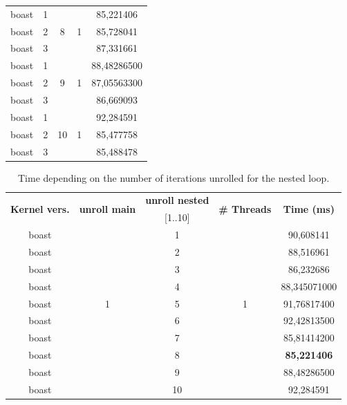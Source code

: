 \documentclass[10pt,twoside]{article}   	%
\begin{document}
\begin{table}[ht!]
{\begin{tabular}{|c|c|c|c|c|}
boast &    1 &  &  & 85,221406 \\ \cline{1-2}  \cline{5-5}
boast &    2 & 8 & 1 & 85,728041 \\ \cline{1-2}  \cline{5-5}
boast &   3 &  &  & 87,331661 \\ \hline \hline

boast &   1 &  &  & 88,48286500 \\ \cline{1-2}  \cline{5-5}
boast &    2 & 9 & 1 & 87,05563300 \\ \cline{1-2}  \cline{5-5}
boast &    3 &  &  & 86,669093 \\ \hline \hline

boast &    1 &  &  & 92,284591 \\ \cline{1-2}  \cline{5-5}
boast &    2 & 10 & 1 & 85,477758 \\ \cline{1-2}  \cline{5-5}
boast &   3 & &  & 85,488478 \\ \hline
\end{tabular}
}
\label{tab:2}
\end{table}



\begin{table}[ht!]
\centering
\caption{Time depending on the number of iterations unrolled for the nested loop.}
{\scriptsize
\begin{tabular}{|c|c|c|c|c|} \hline 
\multirow{2}{*}{ {{\bf{Kernel vers.}}} }	 	 &  \multirow{2}{*}{ {{\bf{unroll main}}} }  &  {{\bf{unroll nested}}}   &  \multirow{2}{*}{ {{\bf{\# Threads}}} }   &  \multirow{2}{*}{ {{\bf{Time (ms)}}} }  \\ 
						 		 &   		 					    &  	 		[1..10]				           & 	 						      &  				\\ \hline \hline
boast &     & 1 &  & 90,608141 \\ \cline{1-1}  \cline{3-3}  \cline{5-5}
boast &     & 2 &  & 88,516961 \\ \cline{1-1}  \cline{3-3}  \cline{5-5}
boast &    & 3 &  & 86,232686 \\ \cline{1-1}  \cline{3-3}  \cline{5-5} 
boast &   & 4 &  & 88,345071000 \\ \cline{1-1}  \cline{3-3}  \cline{5-5}
boast &   1 & 5 & 1 & 91,76817400 \\ \cline{1-1}  \cline{3-3}  \cline{5-5}
boast &     & 6 &  & 92,42813500 \\ \cline{1-1}  \cline{3-3}  \cline{5-5}
boast &    & 7 &  & 85,81414200 \\ \cline{1-1}  \cline{3-3}  \cline{5-5}
boast &     & 8 &  & {\bf{85,221406}} \\ \cline{1-1}  \cline{3-3}  \cline{5-5}
boast &    & 9 &  & 88,48286500 \\ \cline{1-1}  \cline{3-3}  \cline{5-5}
boast &     & 10 &  & 92,284591 \\ \hline
\end{tabular}
}
\label{tab:3}
\end{table}
\end{document}
